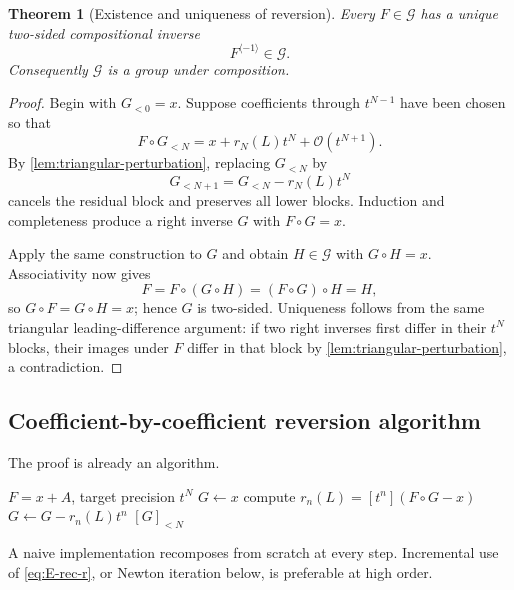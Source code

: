 \documentclass[11pt]{article}
\theoremstyle{pltheorem}
\newtheorem{theorem}{Theorem}[section]
\newcommand{\Gnear}{\mathcal G}
\newcommand{\bigO}{\mathcal O}
\newcommand{\rev}{\langle-1\rangle}
\newcommand{\compose}{\mathbin{\circ}}
\begin{document}
\begin{theorem}[Existence and uniqueness of reversion]\label{thm:reversion-existence}
Every \(F\in\Gnear\) has a unique two-sided compositional inverse
\begin{equation}\label{eq:inverse-in-Gnear}
 F^{\rev}\in\Gnear.
\end{equation}
Consequently \(\Gnear\) is a group under composition.
\end{theorem}

\begin{proof}
Begin with \(G_{<0}=x\).  Suppose coefficients through \(t^{N-1}\) have been chosen so that
\begin{equation}\label{eq:reversion-residual-N}
 F\compose G_{<N}=x+r_N(L)t^N+\bigO(t^{N+1}).
\end{equation}
By \cref{lem:triangular-perturbation}, replacing \(G_{<N}\) by
\[
 G_{<N+1}=G_{<N}-r_N(L)t^N
\]
cancels the residual block and preserves all lower blocks.  Induction and completeness produce a right inverse \(G\) with \(F\compose G=x\).

Apply the same construction to \(G\) and obtain \(H\in\Gnear\) with
\(G\compose H=x\).  Associativity now gives
\[
 F=F\compose(G\compose H)=(F\compose G)\compose H=H,
\]
so \(G\compose F=G\compose H=x\); hence \(G\) is two-sided.  Uniqueness follows from the same triangular leading-difference argument: if two right inverses first differ in their \(t^N\) blocks, their images under \(F\) differ in that block by \cref{lem:triangular-perturbation}, a contradiction.
\end{proof}

\subsection{Coefficient-by-coefficient reversion algorithm}

The proof is already an algorithm.

\begin{algorithm}[htbp]
\caption{Triangular reversion in \(\Gnear\)}
\label{alg:triangular-reversion}
\begin{algorithmic}[1]
\Require \(F=x+A\), target precision \(t^N\)
\State \(G\gets x\)
  \State compute \(r_n(L)=[t^n](F\compose G-x)\)
  \State \(G\gets G-r_n(L)t^n\)
\EndFor
\State \Return \([G]_{<N}\)
\end{algorithmic}
\end{algorithm}

A naive implementation recomposes from scratch at every step.  Incremental use of \cref{eq:E-rec-r}, or Newton iteration below, is preferable at high order.
\end{document}
